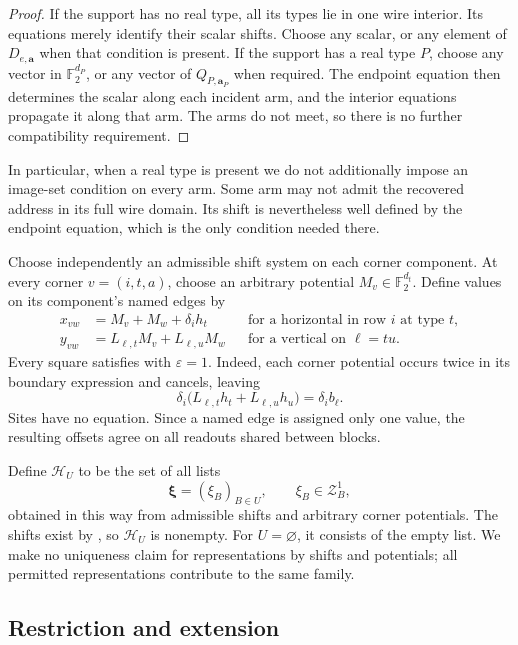 \documentclass[11pt]{article}
\theoremstyle{definition}
\newcommand{\F}{\mathbb F_2}
\newcommand{\cZ}{\mathcal Z}
\newcommand{\cH}{\mathcal H}
\newcommand{\eps}{\varepsilon}
\begin{document}
\begin{proof}
If the support has no real type, all its types lie in one wire interior.
Its equations merely identify their scalar shifts. Choose any scalar,
or any element of \(D_{e,\mathbf a}\) when that condition is present.
If the support has a real type \(P\), choose any vector in
\(\F^{d_P}\), or any vector of \(Q_{P,\mathbf a_P}\) when required.
The endpoint equation then determines the scalar along each incident
arm, and the interior equations propagate it along that arm. The arms
do not meet, so there is no further compatibility requirement.
\end{proof}

In particular, when a real type is present we do not additionally impose
an image-set condition on every arm. Some arm may not admit the
recovered address in its full wire domain. Its shift is nevertheless
well defined by the endpoint equation, which is the only condition
needed there.

Choose independently an admissible shift system on each corner
component. At every corner \(v=(i,t,a)\), choose an arbitrary potential
\(M_v\in\F^{d_t}\). Define values on its component's named edges by
\begin{equation}
\begin{aligned}
 x_{vw}&=M_v+M_w+\delta_i h_t
 &&\text{for a horizontal in row \(i\) at type \(t\)},\\
 y_{vw}&=L_{\ell,t}M_v+L_{\ell,u}M_w
 &&\text{for a vertical on \(\ell=tu\)}.
\end{aligned}
\label{offset:eq-potentials}
\end{equation}
Every square satisfies  with \(\eps=1\).
Indeed, each corner potential occurs twice in its boundary expression
and cancels, leaving
\[
 \delta_i\bigl(L_{\ell,t}h_t+L_{\ell,u}h_u\bigr)
       =\delta_i b_\ell.
\]
Sites have no equation. Since a named edge is assigned only one value,
the resulting offsets agree on all readouts shared between blocks.

Define \(\cH_U\) to be the set of all lists
\[
  \boldsymbol\xi=(\xi_B)_{B\in U},
  \qquad \xi_B\in\cZ_B^1,
\]
obtained in this way from admissible shifts and arbitrary corner
potentials. The shifts exist by , so
\(\cH_U\) is nonempty. For \(U=\varnothing\), it consists of the empty
list. We make no uniqueness claim for representations by shifts and
potentials; all permitted representations contribute to the same family.

\subsection{Restriction and extension}
\label{offset:restriction}
\end{document}
